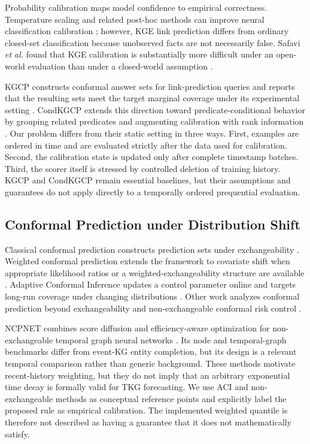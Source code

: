 \documentclass[information,article,submit,oneauthor,pdftex]{Definitions/mdpi}
\begin{document}
Probability calibration maps model confidence to empirical correctness.
Temperature scaling and related post-hoc methods can improve neural
classification calibration \cite{guo2017calibration}; however, KGE link
prediction differs from ordinary closed-set classification because unobserved
facts are not necessarily false. Safavi \emph{et al.} found that KGE
calibration is substantially more difficult under an open-world evaluation than
under a closed-world assumption \cite{safavi2020calibration}.

KGCP constructs conformal answer sets for link-prediction queries and reports
that the resulting sets meet the target marginal coverage under its experimental
setting \cite{zhu2025kgcp}. CondKGCP extends this direction toward
predicate-conditional behavior by grouping related predicates and augmenting
calibration with rank information \cite{zhu2025condkgcp}. Our problem differs
from their static setting in three ways. First, examples are ordered in time and are evaluated strictly
after the data used for calibration. Second, the calibration state is updated
only after complete timestamp batches. Third, the scorer itself is stressed by
controlled deletion of training history. KGCP and CondKGCP remain essential
baselines, but their assumptions and guarantees do not apply directly to a
temporally ordered prequential evaluation.

\subsection{Conformal Prediction under Distribution Shift}

Classical conformal prediction constructs prediction sets under exchangeability
\cite{vovk2005algorithmic,angelopoulos2023gentle}. Weighted conformal prediction
extends the framework to covariate shift when appropriate likelihood ratios or a
weighted-exchangeability structure are available
\cite{tibshirani2019covariate}. Adaptive Conformal Inference updates a control
parameter online and targets long-run coverage under changing distributions
\cite{gibbs2021adaptive}. Other work analyzes conformal prediction beyond
exchangeability and non-exchangeable conformal risk control
\cite{barber2023beyond,farinhas2024nexcrc}.

NCPNET combines score diffusion and efficiency-aware optimization for
non-exchangeable temporal graph neural networks \cite{wang2025ncpnet}. Its node
and temporal-graph benchmarks differ from event-KG entity completion, but its
design is a relevant temporal comparison rather than generic background. These
methods motivate recent-history weighting, but they do not imply that an
arbitrary exponential time decay is formally valid for TKG forecasting. We use
ACI and non-exchangeable methods as conceptual reference points and explicitly
label the proposed rule as empirical calibration. The implemented weighted
quantile is therefore not described as having a guarantee that it does not
mathematically satisfy.
\end{document}

